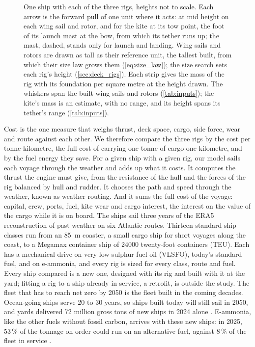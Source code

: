 \begin{figure}[tbp]
\centering

\caption{One ship with each of the three rigs, heights not to scale. Each arrow is the forward pull of one unit where it acts: at mid height on each wing sail and rotor, and for the kite at its tow point, the foot of its launch mast at the bow, from which its tether runs up; the mast, dashed, stands only for launch and landing. Wing sails and rotors are drawn as tall as their reference unit, the tallest built, from which their size law grows them (\cref{eq:size_law}); the size search sets each rig's height (\cref{sec:deck_rigs}). Each strip gives the mass of the rig with its foundation per square metre at the height drawn. The whiskers span the built wing sails and rotors (\cref{tab:inputs}); the kite's mass is an estimate, with no range, and its height spans its tether's range (\cref{tab:inputs}).}
\label{fig:rigs}
\end{figure}

Cost is the one measure that weighs thrust, deck space, cargo, side force, wear and route against each other. We therefore compare the three rigs by the cost per tonne-kilometre, the full cost of carrying one tonne of cargo one kilometre, and by the fuel energy they save. For a given ship with a given rig, our model sails each voyage through the weather and adds up what it costs. It computes the thrust the engine must give, from the resistance of the hull and the forces of the rig balanced by hull and rudder. It chooses the path and speed through the weather, known as weather routing. And it sums the full cost of the voyage: capital, crew, ports, fuel, kite wear and cargo interest, the interest on the value of the cargo while it is on board. The ships sail three years of the ERA5 reconstruction of past weather on six Atlantic routes. Thirteen standard ship classes run from an \SI{85}{m} coaster, a small cargo ship for short voyages along the coast, to a Megamax container ship of \num{24000} twenty-foot containers (TEU). Each has a mechanical drive on very low sulphur fuel oil (VLSFO), today's standard fuel, and on e-ammonia, and every rig is sized for every class, route and fuel. Every ship compared is a new one, designed with its rig and built with it at the yard; fitting a rig to a ship already in service, a retrofit, is outside the study. The fleet that has to reach net zero by 2050 is the fleet built in the coming decades. Ocean-going ships serve 20 to 30 years, so ships built today will still sail in 2050, and yards delivered 72 million gross tons of new ships in 2024 alone \citep[pp.~57, 64]{unctad2025}. E-ammonia, like the other fuels without fossil carbon, arrives with these new ships: in 2025, 53\,\% of the tonnage on order could run on an alternative fuel, against 8\,\% of the fleet in service \citep[p.~62]{unctad2025}.

